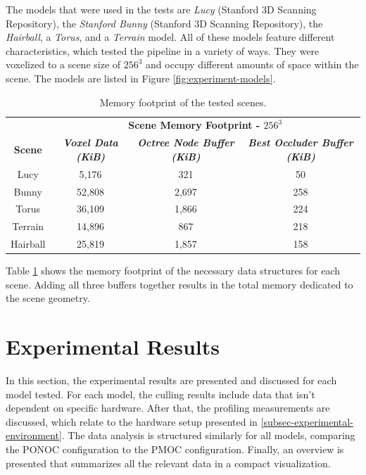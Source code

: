 \noindent
The models that were used in the tests are \emph{Lucy} (Stanford 3D Scanning Repository), the 
\emph{Stanford Bunny} (Stanford 3D Scanning Repository), the \emph{Hairball}, a \emph{Torus}, 
and a \emph{Terrain} model. All of these models feature different characteristics, which tested 
the pipeline in a variety of ways. They were voxelized to a scene size of $256^3$ and occupy 
different amounts of space within the scene. The models are listed in Figure 
\ref{fig:experiment-models}. \\


\begin{table}[htbp]
  \begin{center}
    \begin{tabular}{|c|c|c|c|}
      \hline
      \textbf{}&\multicolumn{3}{|c|}{\textbf{Scene Memory Footprint - $256^3$}} \\
      \cline{2-4} 
      \textbf{Scene} & \textbf{\textit{Voxel Data (KiB)}}& \textbf{\textit{Octree Node Buffer (KiB)}} & \textbf{\textit{Best Occluder Buffer (KiB)}} \\
      \hline
      Lucy        & 5,176   & 321   & 50  \\
      Bunny       & 52,808  & 2,697 & 258 \\
      Torus       & 36,109  & 1,866 & 224 \\
      Terrain     & 14,896  & 867   & 218 \\
      Hairball    & 25,819  & 1,857 & 158 \\
      \hline
    \end{tabular}
  \end{center}
  \caption{Memory footprint of the tested scenes.}
  \label{tbl:scene-data-size}
\end{table}

\noindent
Table \ref{tbl:scene-data-size} shows the memory footprint of the necessary data structures for each scene. 
Adding all three buffers together results in the total memory dedicated to the scene geometry.

\section{Experimental Results}

In this section, the experimental results are presented and discussed for each model tested.
For each model, the culling results include data that isn't dependent on specific hardware. 
After that, the profiling measurements are discussed, which relate to the hardware setup presented 
in \ref{subsec-experimental-environment}. The data analysis is structured similarly for all models,
comparing the \ac{PONOC} configuration to the \ac{PMOC} configuration. Finally, an overview 
is presented that summarizes all the relevant data in a compact visualization.

